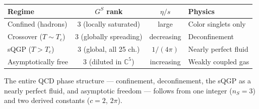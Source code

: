 \begin{center}
\begin{tabular}{lccl}
\hline
Regime & $G^S$ rank & $\eta/s$ & Physics \\
\hline
Confined (hadrons) & 3 (locally saturated) & large & Color singlets only \\
Crossover ($T \sim T_c$) & 3 (globally spreading) & decreasing & Deconfinement \\
sQGP ($T > T_c$) & 3 (global, all 25 ch.) & $1/(4\pi)$ & Nearly perfect fluid \\
Asymptotically free & 3 (diluted in $\mathbb{C}^5$) & increasing & Weakly coupled gas \\
\hline
\end{tabular}
\end{center}

The entire QCD phase structure --- confinement, deconfinement, the sQGP as a nearly perfect fluid, and asymptotic freedom --- follows from one integer ($n_S = 3$) and two derived constants ($c = 2$, $2\pi$).

